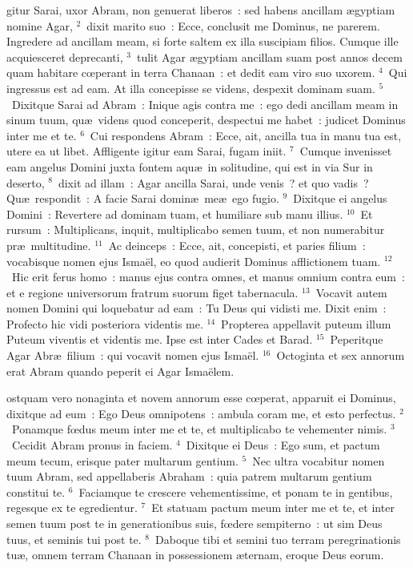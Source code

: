 \bchapter
{}gitur Sarai, uxor Abram, non genuerat liberos~: sed habens ancillam \ae gyptiam nomine Agar,
${}^{2}$~dixit marito suo~: Ecce, conclusit me Dominus, ne parerem. Ingredere ad ancillam meam, si forte saltem ex illa suscipiam filios. Cumque ille acquiesceret deprecanti,
${}^{3}$~tulit Agar \ae gyptiam ancillam suam post annos decem quam habitare cœperant in terra Chanaan~: et dedit eam viro suo uxorem.
${}^{4}$~Qui ingressus est ad eam. At illa concepisse se videns, despexit dominam suam.
${}^{5}$~Dixitque Sarai ad Abram~: Inique agis contra me~: ego dedi ancillam meam in sinum tuum, qu\ae\ videns quod conceperit, despectui me habet~: judicet Dominus inter me et te.
${}^{6}$~Cui respondens Abram~: Ecce, ait, ancilla tua in manu tua est, utere ea ut libet. Affligente igitur eam Sarai, fugam iniit.
${}^{7}$~Cumque invenisset eam angelus Domini juxta fontem aqu\ae\ in solitudine, qui est in via Sur in deserto,
${}^{8}$~dixit ad illam~: Agar ancilla Sarai, unde venis~? et quo vadis~? Qu\ae\ respondit~: A facie Sarai domin\ae\ me\ae\ ego fugio.
${}^{9}$~Dixitque ei angelus Domini~: Revertere ad dominam tuam, et humiliare sub manu illius.
${}^{10}$~Et rursum~: Multiplicans, inquit, multiplicabo semen tuum, et non numerabitur pr\ae\ multitudine.
${}^{11}$~Ac deinceps~: Ecce, ait, concepisti, et paries filium~: vocabisque nomen ejus Isma\"el, eo quod audierit Dominus afflictionem tuam.
${}^{12}$~Hic erit ferus homo~: manus ejus contra omnes, et manus omnium contra eum~: et e regione universorum fratrum suorum figet tabernacula.
${}^{13}$~Vocavit autem nomen Domini qui loquebatur ad eam~: Tu Deus qui vidisti me. Dixit enim~: Profecto hic vidi posteriora videntis me.
${}^{14}$~Propterea appellavit puteum illum Puteum viventis et videntis me. Ipse est inter Cades et Barad.
${}^{15}$~Peperitque Agar Abr\ae\ filium~: qui vocavit nomen ejus Isma\"el.
${}^{16}$~Octoginta et sex annorum erat Abram quando peperit ei Agar Isma\"elem.

\bchapter
{}ostquam vero nonaginta et novem annorum esse cœperat, apparuit ei Dominus, dixitque ad eum~: Ego Deus omnipotens~: ambula coram me, et esto perfectus.
${}^{2}$~Ponamque fœdus meum inter me et te, et multiplicabo te vehementer nimis.
${}^{3}$~Cecidit Abram pronus in faciem.
${}^{4}$~Dixitque ei Deus~: Ego sum, et pactum meum tecum, erisque pater multarum gentium.
${}^{5}$~Nec ultra vocabitur nomen tuum Abram, sed appellaberis Abraham~: quia patrem multarum gentium constitui te.
${}^{6}$~Faciamque te crescere vehementissime, et ponam te in gentibus, regesque ex te egredientur.
${}^{7}$~Et statuam pactum meum inter me et te, et inter semen tuum post te in generationibus suis, fœdere sempiterno~: ut sim Deus tuus, et seminis tui post te.
${}^{8}$~Daboque tibi et semini tuo terram peregrinationis tu\ae , omnem terram Chanaan in possessionem \ae ternam, eroque Deus eorum.


